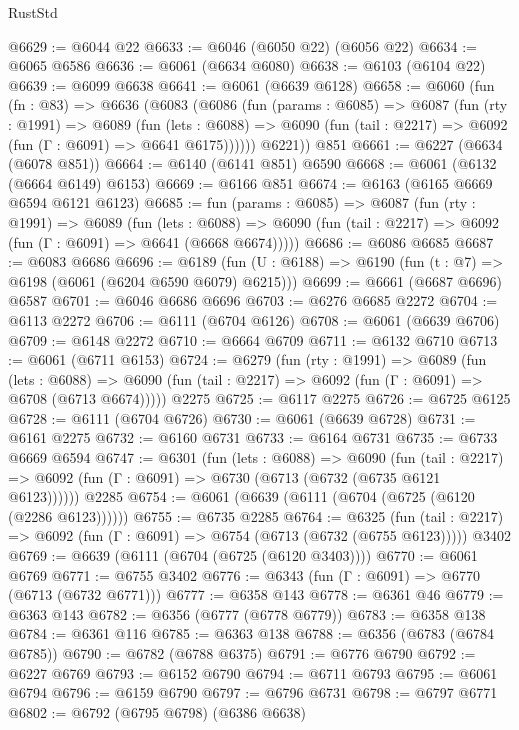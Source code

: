\begin{lexlean}{RustStd}
\begin{coremodule}
@6629 := @6044 @22
@6633 := @6046 (@6050 @22) (@6056 @22)
@6634 := @6065 @6586
@6636 := @6061 (@6634 @6080)
@6638 := @6103 (@6104 @22)
@6639 := @6099 @6638
@6641 := @6061 (@6639 @6128)
@6658 := @6060
    (fun (fn : @83) =>
    @6636
      (@6083
        (@6086
          (fun (params : @6085) =>
          @6087
            (fun (rty : @1991) =>
            @6089
              (fun (lets : @6088) =>
              @6090 (fun (tail : @2217) => @6092 (fun (Γ : @6091) => @6641 @6175))))))
        @6221))
    @851
@6661 := @6227 (@6634 (@6078 @851))
@6664 := @6140 (@6141 @851) @6590
@6668 := @6061 (@6132 (@6664 @6149) @6153)
@6669 := @6166 @851
@6674 := @6163 (@6165 @6669 @6594 @6121 @6123)
@6685 := fun (params : @6085) =>
  @6087
    (fun (rty : @1991) =>
    @6089
      (fun (lets : @6088) =>
      @6090 (fun (tail : @2217) => @6092 (fun (Γ : @6091) => @6641 (@6668 @6674)))))
@6686 := @6086 @6685
@6687 := @6083 @6686
@6696 := @6189 (fun (U : @6188) => @6190 (fun (t : @7) => @6198 (@6061 (@6204 @6590 @6079) @6215)))
@6699 := @6661 (@6687 @6696) @6587
@6701 := @6046 @6686 @6696
@6703 := @6276 @6685 @2272
@6704 := @6113 @2272
@6706 := @6111 (@6704 @6126)
@6708 := @6061 (@6639 @6706)
@6709 := @6148 @2272
@6710 := @6664 @6709
@6711 := @6132 @6710
@6713 := @6061 (@6711 @6153)
@6724 := @6279
    (fun (rty : @1991) =>
    @6089
      (fun (lets : @6088) =>
      @6090 (fun (tail : @2217) => @6092 (fun (Γ : @6091) => @6708 (@6713 @6674)))))
    @2275
@6725 := @6117 @2275
@6726 := @6725 @6125
@6728 := @6111 (@6704 @6726)
@6730 := @6061 (@6639 @6728)
@6731 := @6161 @2275
@6732 := @6160 @6731
@6733 := @6164 @6731
@6735 := @6733 @6669 @6594
@6747 := @6301
    (fun (lets : @6088) =>
    @6090
      (fun (tail : @2217) => @6092 (fun (Γ : @6091) => @6730 (@6713 (@6732 (@6735 @6121 @6123))))))
    @2285
@6754 := @6061 (@6639 (@6111 (@6704 (@6725 (@6120 (@2286 @6123))))))
@6755 := @6735 @2285
@6764 := @6325
    (fun (tail : @2217) => @6092 (fun (Γ : @6091) => @6754 (@6713 (@6732 (@6755 @6123)))))
    @3402
@6769 := @6639 (@6111 (@6704 (@6725 (@6120 @3403))))
@6770 := @6061 @6769
@6771 := @6755 @3402
@6776 := @6343 (fun (Γ : @6091) => @6770 (@6713 (@6732 @6771)))
@6777 := @6358 @143
@6778 := @6361 @46
@6779 := @6363 @143
@6782 := @6356 (@6777 (@6778 @6779))
@6783 := @6358 @138
@6784 := @6361 @116
@6785 := @6363 @138
@6788 := @6356 (@6783 (@6784 @6785))
@6790 := @6782 (@6788 @6375)
@6791 := @6776 @6790
@6792 := @6227 @6769
@6793 := @6152 @6790
@6794 := @6711 @6793
@6795 := @6061 @6794
@6796 := @6159 @6790
@6797 := @6796 @6731
@6798 := @6797 @6771
@6802 := @6792 (@6795 @6798) (@6386 @6638)

\end{coremodule}
\end{lexlean}
